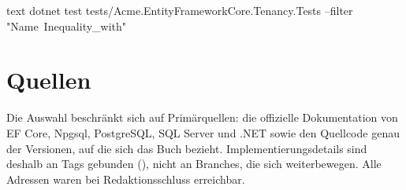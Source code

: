 \begin{sourcecode}[Shell]{text}
dotnet test tests/Acme.EntityFrameworkCore.Tenancy.Tests --filter "Name~Inequality_with"
\end{sourcecode}

\chapter{Quellen}\label{app:F}

Die Auswahl beschränkt sich auf Primärquellen: die offizielle Dokumentation von EF Core, Npgsql,
PostgreSQL, SQL Server und .NET sowie den Quellcode genau der Versionen, auf die sich das Buch
bezieht. Implementierungsdetails sind deshalb an Tags gebunden (), nicht an
Branches, die sich weiterbewegen. Alle Adressen waren bei Redaktionsschluss erreichbar.

